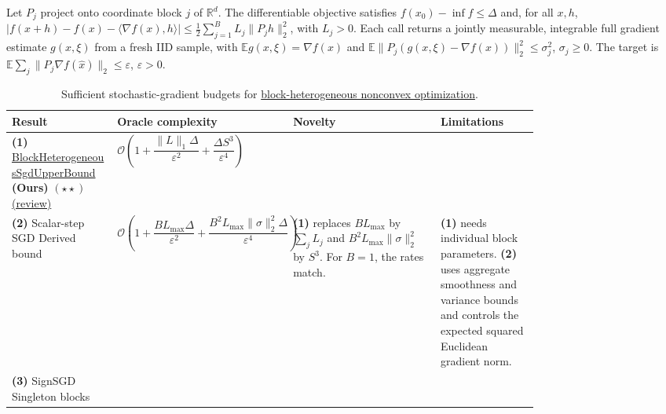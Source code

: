 \begin{table}[tp]
\centering
\caption{Sufficient stochastic-gradient budgets for \href{https://github.com/k3nfalt/longtails/blob/main/LongTails/Setups/BlockHeterogeneousNonconvex.lean}{block-heterogeneous nonconvex optimization}.}\label{tab:BlockHeterogeneousNonconvex}
\parbox{\linewidth}{\footnotesize Let $P_j$ project onto coordinate block $j$ of $\mathbb R^d$. The differentiable objective satisfies $f(x_0)-\inf f\le\Delta$ and, for all $x,h$, $|f(x+h)-f(x)-\langle\nabla f(x),h\rangle|\le\tfrac12\sum_{j=1}^B L_j\|P_jh\|_2^2$, with $L_j>0$. Each call returns a jointly measurable, integrable full gradient estimate $g(x,\xi)$ from a fresh IID sample, with $\mathbb E g(x,\xi)=\nabla f(x)$ and $\mathbb E\|P_j(g(x,\xi)-\nabla f(x))\|_2^2\le\sigma_j^2$, $\sigma_j\ge0$. The target is $\mathbb E\sum_j\|P_j\nabla f(\hat x)\|_2\le\varepsilon$, $\varepsilon>0$.}\par\smallskip
\begin{threeparttable}
\footnotesize
\setlength{\tabcolsep}{4pt}\renewcommand{\arraystretch}{1.25}
\begin{tabularx}{\linewidth}{@{}>{\raggedright\arraybackslash}p{0.20\linewidth}>{\raggedright\arraybackslash}p{0.29\linewidth}>{\raggedright\arraybackslash}p{0.29\linewidth}>{\raggedright\arraybackslash}X@{}}
\toprule
\textbf{Result} & \textbf{Oracle complexity} & \textbf{Novelty} & \textbf{Limitations} \\
\midrule
\textbf{(1)} \href{https://github.com/k3nfalt/longtails/blob/main/LongTails/Theorems/BlockHeterogeneousSgdUpperBound.lean}{Block\allowbreak Heterogeneous\allowbreak Sgd\allowbreak Upper\allowbreak Bound} \textbf{(Ours)} $(\star\star)$ \href{https://github.com/k3nfalt/longtails/blob/main/scripts/reviews/BlockHeterogeneousSgdUpperBound.md}{(review)}
& $\mathcal{O}\!\left(1+\dfrac{\|L\|_1\Delta}{\varepsilon^2}+\dfrac{\Delta S^3}{\varepsilon^4}\right)$ & & \\
\midrule[1.2pt]
\textbf{(2)} Scalar-step SGD \citep{canGhadimiLan2013}\newline Derived bound
& $\mathcal{O}\!\left(1+\dfrac{B L_{\max}\Delta}{\varepsilon^2}+\dfrac{B^2 L_{\max}\|\sigma\|_2^2\Delta}{\varepsilon^4}\right)$
& \textbf{(1)} replaces $B L_{\max}$ by $\sum_jL_j$ and $B^2 L_{\max}\|\sigma\|_2^2$ by $S^3$. For $B=1$, the rates match.
& \textbf{(1)} needs individual block parameters. \textbf{(2)} uses aggregate smoothness and variance bounds and controls the expected squared Euclidean gradient norm. \\
\midrule
\textbf{(3)} SignSGD \citep{bssTaoYuZhang2026v1}\newline Singleton blocks

\end{tabularx}
\end{threeparttable}
\end{table}
